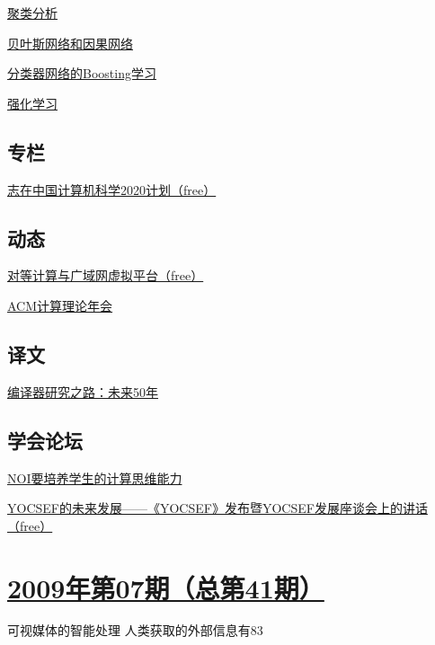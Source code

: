 \documentclass[a4paper]{article}
\begin{document}
\href{http://history.ccf.org.cn/resources/1190201776262/2010/04/15/042023.pdf}{聚类分析}

\href{http://history.ccf.org.cn/resources/1190201776262/2010/04/15/042031.pdf}{贝叶斯网络和因果网络}

\href{http://history.ccf.org.cn/resources/1190201776262/2010/04/15/042036.pdf}{分类器网络的Boosting学习}

\href{http://history.ccf.org.cn/resources/1190201776262/2010/04/15/042042.pdf}{强化学习}

\subsection{专栏}
\href{http://history.ccf.org.cn/resources/1190201776262/2010/04/15/042052.pdf}{志在中国计算机科学2020计划（free）}

\subsection{动态}
\href{http://history.ccf.org.cn/resources/1190201776262/2010/04/15/042058.pdf}{对等计算与广域网虚拟平台（free）}

\href{http://history.ccf.org.cn/resources/1190201776262/2010/04/15/042062.pdf}{ACM计算理论年会}

\subsection{译文}
\href{http://history.ccf.org.cn/resources/1190201776262/2010/04/15/042064.pdf}{编译器研究之路：未来50年}

\subsection{学会论坛}
\href{http://history.ccf.org.cn/resources/1190201776262/2010/04/15/042092.pdf}{NOI要培养学生的计算思维能力}

\href{http://history.ccf.org.cn/resources/1190201776262/2010/04/15/042094.pdf}{YOCSEF的未来发展——《YOCSEF》发布暨YOCSEF发展座谈会上的讲话（free）}


\section{\href{http://history.ccf.org.cn/sites/ccf/jsjtbbd.jsp?contentId=2542567629040}{\textbf{2009年第07期（总第41期）}}}
可视媒体的智能处理 人类获取的外部信息有83%
\end{document}
